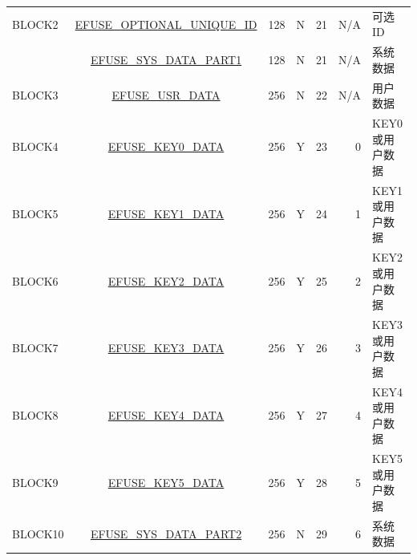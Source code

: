 \begin{longtable}[c]{ |l|c|r|c|r|r|l| }
    BLOCK2 & \hyperref[fielddesc:EFUSEOPTIONALUNIQUEID]{EFUSE\_OPTIONAL\_UNIQUE\_ID} & 128 & N & 21 & N/A & 可选 ID \\\cline{2-7}
    & \hyperref[fielddesc:EFUSESYSDATAPART14]{EFUSE\_SYS\_DATA\_PART1} & 128 & N & 21 & N/A & 系统数据 \\\hline		
    BLOCK3 & \hyperref[fielddesc:EFUSEUSRDATA0]{EFUSE\_USR\_DATA} & 256 & N & 22 & N/A & 用户数据 \\\hline
    BLOCK4 & \hyperref[fielddesc:EFUSEKEY0DATA0]{EFUSE\_KEY0\_DATA} & 256 & Y & 23 & 0 & KEY0 或用户数据 \\
    \hline
    BLOCK5 & \hyperref[fielddesc:EFUSEKEY1DATA0]{EFUSE\_KEY1\_DATA} & 256 & Y & 24 & 1 & KEY1 或用户数据 \\
    \hline
    BLOCK6 & \hyperref[fielddesc:EFUSEKEY2DATA0]{EFUSE\_KEY2\_DATA} & 256 & Y & 25 & 2 & KEY2 或用户数据 \\
    \hline
    BLOCK7 & \hyperref[fielddesc:EFUSEKEY3DATA0]{EFUSE\_KEY3\_DATA} & 256 & Y & 26 & 3 & KEY3 或用户数据 \\
    \hline
    BLOCK8 & \hyperref[fielddesc:EFUSEKEY4DATA0]{EFUSE\_KEY4\_DATA} & 256 & Y & 27 & 4 & KEY4 或用户数据 \\
    \hline
    BLOCK9 & \hyperref[fielddesc:EFUSEKEY5DATA0]{EFUSE\_KEY5\_DATA} & 256 & Y & 28 & 5 & KEY5 或用户数据 \\
    \hline
    BLOCK10 & \hyperref[fielddesc:EFUSESYSDATAPART20]{EFUSE\_SYS\_DATA\_PART2} & 256 & N & 29 & 6 & 系统数据 \\
    \hline
\end{longtable}
